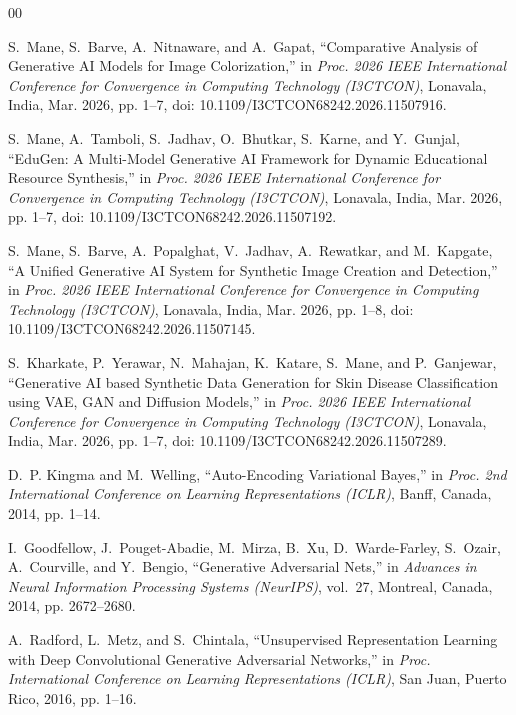 \documentclass[conference]{IEEEtran}
\begin{document}
\begin{thebibliography}{00}

S.~Mane, S.~Barve, A.~Nitnaware, and A.~Gapat, ``Comparative Analysis of Generative AI Models for Image Colorization,'' in \emph{Proc. 2026 IEEE International Conference for Convergence in Computing Technology (I3CTCON)}, Lonavala, India, Mar. 2026, pp. 1--7, doi: 10.1109/I3CTCON68242.2026.11507916.

S.~Mane, A.~Tamboli, S.~Jadhav, O.~Bhutkar, S.~Karne, and Y.~Gunjal, ``EduGen: A Multi-Model Generative AI Framework for Dynamic Educational Resource Synthesis,'' in \emph{Proc. 2026 IEEE International Conference for Convergence in Computing Technology (I3CTCON)}, Lonavala, India, Mar. 2026, pp. 1--7, doi: 10.1109/I3CTCON68242.2026.11507192.

S.~Mane, S.~Barve, A.~Popalghat, V.~Jadhav, A.~Rewatkar, and M.~Kapgate, ``A Unified Generative AI System for Synthetic Image Creation and Detection,'' in \emph{Proc. 2026 IEEE International Conference for Convergence in Computing Technology (I3CTCON)}, Lonavala, India, Mar. 2026, pp. 1--8, doi: 10.1109/I3CTCON68242.2026.11507145.

S.~Kharkate, P.~Yerawar, N.~Mahajan, K.~Katare, S.~Mane, and P.~Ganjewar, ``Generative AI based Synthetic Data Generation for Skin Disease Classification using VAE, GAN and Diffusion Models,'' in \emph{Proc. 2026 IEEE International Conference for Convergence in Computing Technology (I3CTCON)}, Lonavala, India, Mar. 2026, pp. 1--7, doi: 10.1109/I3CTCON68242.2026.11507289.

D.~P. Kingma and M.~Welling, ``Auto-Encoding Variational Bayes,'' in \emph{Proc. 2nd International Conference on Learning Representations (ICLR)}, Banff, Canada, 2014, pp. 1--14.

I.~Goodfellow, J.~Pouget-Abadie, M.~Mirza, B.~Xu, D.~Warde-Farley, S.~Ozair, A.~Courville, and Y.~Bengio, ``Generative Adversarial Nets,'' in \emph{Advances in Neural Information Processing Systems (NeurIPS)}, vol.~27, Montreal, Canada, 2014, pp. 2672--2680.

A.~Radford, L.~Metz, and S.~Chintala, ``Unsupervised Representation Learning with Deep Convolutional Generative Adversarial Networks,'' in \emph{Proc. International Conference on Learning Representations (ICLR)}, San Juan, Puerto Rico, 2016, pp. 1--16.


\end{thebibliography}
\end{document}
